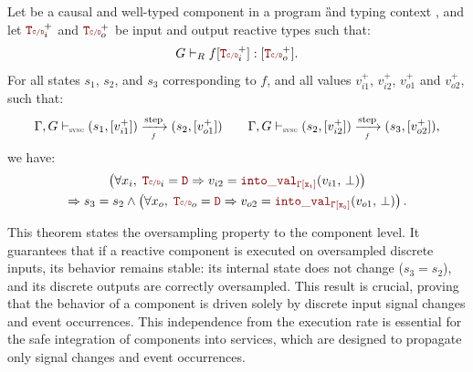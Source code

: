 \begin{theorem}[Oversampling]
    \label{thm:semantics:grsync:theorems:oversampling}
    Let  be a causal and well-typed component in a
    program \G and typing context \tyCtx, and let $\rType_i^+$ and $\rType_o^+$ be input and
    output reactive types such that:
    \begin{equation*}
        \compTypedReact{f}{\rType_i^+}{\rType_o^+}.
    \end{equation*}
    For all states $s_1$, $s_2$, and $s_3$ corresponding to $f$, and all values $v_{i1}^+$,
    $v_{i2}^+$, $v_{o1}^+$ and $v_{o2}^+$, such that:
    \begin{equation*}
        \compOpsem{s_1}{v_{i1}^+}{f}{s_2}{v_{o1}^+} \qquad \compOpsem{s_2}{v_{i2}^+}{f}{s_3}{v_{o2}^+},
    \end{equation*}
    we have:
    \begin{multline*}
        \left(\forall x_i, \; \rType_i = \dType \Rightarrow v_{i2} = \intoVal{\tyCtx[x_i]}{v_{i1}}{\bot}\right) \\
        \Rightarrow
        s_3 = s_2 \wedge \left(\forall x_o, \; \rType_o = \dType \Rightarrow v_{o2} = \intoVal{\tyCtx[x_o]}{v_{o1}}{\bot}\right).
    \end{multline*}

    This theorem states the oversampling property to the component level. It guarantees that if a
    reactive component is executed on oversampled discrete inputs, its behavior remains stable: its
    internal state does not change ($s_3 = s_2$), and its discrete outputs are correctly
    oversampled. This result is crucial, proving that the behavior of a \GRSync  component is driven
    solely by discrete input signal changes and event occurrences. This independence from the
    execution rate is essential for the safe integration of components into \GRFRP services, which
    are designed to propagate only signal changes and event occurrences.
\end{theorem}
